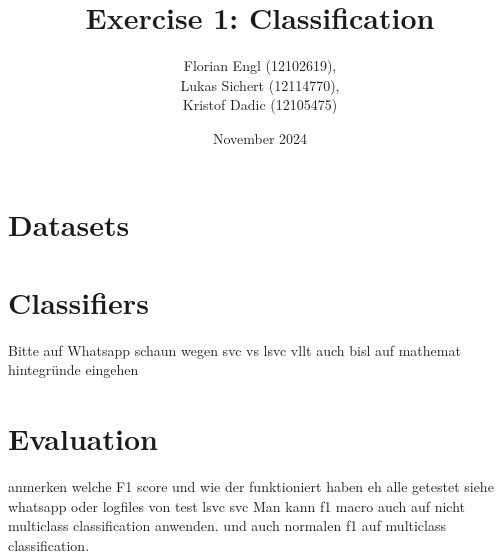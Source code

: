 \documentclass[a4paper,10pt]{article}
\title{Exercise 1: Classification}
\author{Florian Engl (12102619),\\ Lukas Sichert (12114770),\\ Kristof Dadic (12105475)}
\date{November 2024}
\begin{document}
\maketitle

\tableofcontents


\section{Datasets}


\section{Classifiers}
Bitte auf Whatsapp schaun wegen svc vs lsvc vllt auch bisl auf mathemat hintegründe eingehen

\section{Evaluation}
anmerken welche F1 score und wie der funktioniert haben eh alle getestet siehe whatsapp oder logfiles von test lsvc svc Man kann f1 macro auch auf nicht multiclass classification anwenden. und auch normalen f1 auf multiclass classification.
\end{document}
